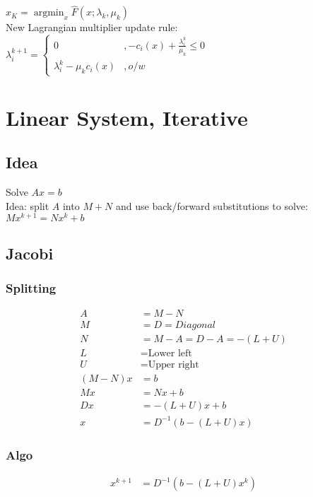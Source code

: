 \documentclass[8pt,letter]{article}
\DeclareMathOperator*{\argmin}{argmin}
\begin{document}
\begin{multicols*}{2}
    $x_K = \argmin_x \hat{F}(x; \lambda_k, \mu_k)$\\

    New Lagrangian multiplier update rule:\\
    
    $\lambda_i^{k+1} = \begin{cases}
      0 &, -c_i(x) + \frac{\lambda_i^k}{\mu_k} \leq 0\\
      \lambda_i^k - \mu_k c_i(x) &, o/w
    \end{cases}$
    
    \vfill\null
    \pagebreak

    \section{Linear System, Iterative}

    \subsection{Idea}
    Solve $Ax=b$\\
    Idea: split $A$ into $M+N$ and use back/forward substitutions to solve:\\
    $Mx^{k+1}=Nx^k+b$
    
    \subsection{Jacobi}
    \subsubsection{Splitting}
    \begin{align*}
      A &= M-N\\
      M &= D = Diagonal\\
      N &= M - A = D - A = -(L+U)\\
      L &= \text{Lower left}\\
      U &= \text{Upper right}\\
      (M-N)x &= b\\
      Mx &= Nx + b\\
      Dx &= -(L+U)x + b\\
      x &= D^{-1}(b -(L+U)x)
    \end{align*}

    \subsubsection{Algo}
    \begin{align*}    
      x^{k+1} &= D^{-1}(b -(L+U)x^k)
    \end{align*}
    

\end{multicols*}
\end{document}
